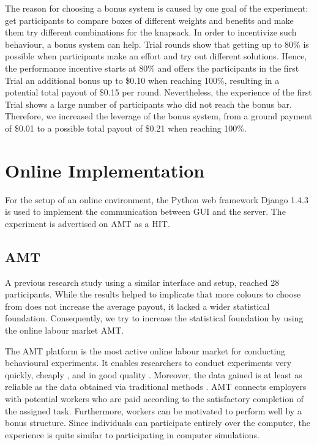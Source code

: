 The reason for choosing a bonus system is caused by one goal of the experiment: get participants to compare boxes of different weights and benefits and make them try different combinations for the knapsack.
In order to incentivize such behaviour, a bonus system can help. Trial rounds show that getting up to 80\% is possible when participants make an effort and try out different solutions. Hence, the performance incentive starts at 80\% and offers the participants in the first Trial an additional bonus up to \$0.10 when reaching 100\%, resulting in a potential total payout of \$0.15 per round. Nevertheless, the experience of the first Trial shows a large number of participants who did not reach the bonus bar. Therefore, we increased the leverage of the bonus system, from a ground payment of \$0.01 to a possible total payout of \$0.21 when reaching 100\%.

\section{Online Implementation}
\label{ch:Experiment:sec:OnlineImplementation}

For the setup of an online environment, the Python web framework Django 1.4.3 is used to implement the communication between \ac{GUI} and the server.
The experiment is advertised on \acf{AMT} as a \ac{HIT}.

\subsection{\acl{AMT}}
\label{ch:Experiment:sec:OnlineImplementation:subsec:AMT}
A previous research study\citep{Schmidt2012} using a similar interface and setup, reached 28 participants. While the results helped to implicate that more colours to choose from does not increase the average payout, it lacked a wider statistical foundation.
Consequently, we try to increase the statistical foundation by using the online labour market \acf{AMT}.

The \ac{AMT} platform is the most active online labour market for conducting behavioural experiments. It enables researchers to conduct experiments very quickly, cheaply \citep{Rand2012}, and in good quality \citep{Gardner2012}. Moreover, the data gained is at least as reliable as the data obtained via traditional methods \citep{Buhrmester2011}. \ac{AMT} connects employers with potential workers who are paid according to the satisfactory completion of the assigned task. Furthermore, workers can be motivated to perform well by a bonus structure. Since individuals can participate entirely over the computer, the experience is quite similar to participating in computer simulations.

